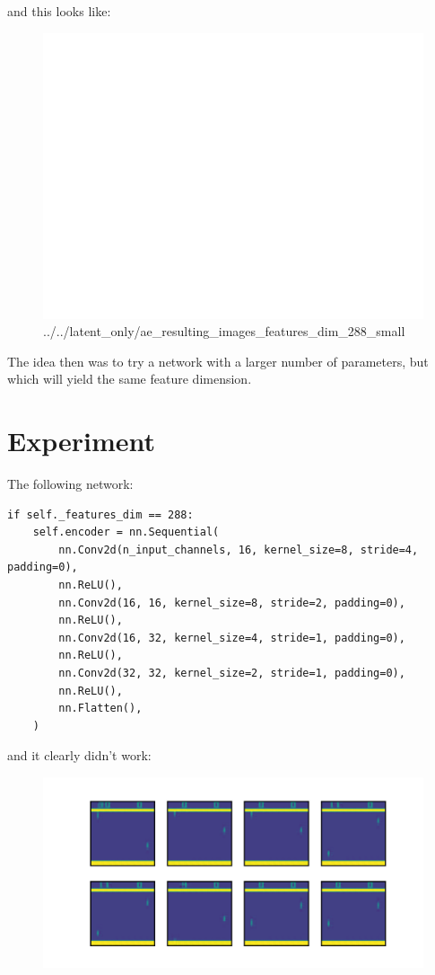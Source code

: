 \documentclass{article}
\begin{document}
and this looks like:
\begin{figure}[htpb]
		\centering
		\includegraphics[width=1.0\textwidth]{../../latent_only/ae_resulting_images_features_dim_288_small.png}
		\caption{../../latent_only/ae_resulting_images_features_dim_288_small}
\end{figure}

The idea then was to try a network with a larger number of parameters,
but which will yield the same feature dimension.

\section{Experiment}
The following network:
\begin{verbatim}
if self._features_dim == 288:
    self.encoder = nn.Sequential(
        nn.Conv2d(n_input_channels, 16, kernel_size=8, stride=4, padding=0),
        nn.ReLU(),
        nn.Conv2d(16, 16, kernel_size=8, stride=2, padding=0),
        nn.ReLU(),
        nn.Conv2d(16, 32, kernel_size=4, stride=1, padding=0),
        nn.ReLU(),
        nn.Conv2d(32, 32, kernel_size=2, stride=1, padding=0),
        nn.ReLU(),
        nn.Flatten(),
    )

\end{verbatim}

and it clearly didn't work:
\begin{figure}[htpb]
		\centering
		\includegraphics[width=1.0\textwidth]{../../latent_only/ae_resulting_images_features_dim_288_slightly_bigger.png}
		\caption{}
		\label{fig:}
\end{figure}
\end{document}
